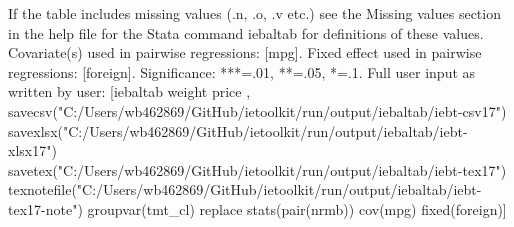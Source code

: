 If the table includes missing values (.n, .o, .v etc.) see the Missing values section in the help file for the Stata command iebaltab for definitions of these values. Covariate(s) used in pairwise regressions: [mpg]. Fixed effect used in pairwise regressions: [foreign]. Significance: ***=.01, **=.05, *=.1. Full user input as written by user: [iebaltab weight price , savecsv("C:/Users/wb462869/GitHub/ietoolkit/run/output/iebaltab/iebt-csv17") savexlsx("C:/Users/wb462869/GitHub/ietoolkit/run/output/iebaltab/iebt-xlsx17") savetex("C:/Users/wb462869/GitHub/ietoolkit/run/output/iebaltab/iebt-tex17") texnotefile("C:/Users/wb462869/GitHub/ietoolkit/run/output/iebaltab/iebt-tex17-note") groupvar(tmt\_cl) replace stats(pair(nrmb)) cov(mpg) fixed(foreign)]
